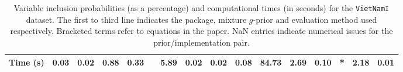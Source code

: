 \documentclass[12pt]{article}
\begin{document}
\begin{sidewaystable}[h!]
{\begin{tabular}{c|r|r|rrrrrr|rrrr|rrr}
	\hline
Time (s) & 0.03 & 0.02 & 0.88 & 0.33  &       &  5.89 & 0.02 & 0.02 & 0.08 & 84.73 & 2.69 & 0.10    & *        & 2.18 & 0.01 \\	\hline	
\end{tabular}
}
	\caption{Variable inclusion probabilities (as a percentage) and computational times (in seconds) for the {\tt VietNamI} dataset.
	The first to third line indicates the package, mixture $g$-prior and evaluation method used respectively. Bracketed terms
	refer to equations in the paper. NaN entries indicate numerical issues for the prior/implementation pair.}
\label{tab:VietNamI}
\end{sidewaystable}
 
\end{document}
